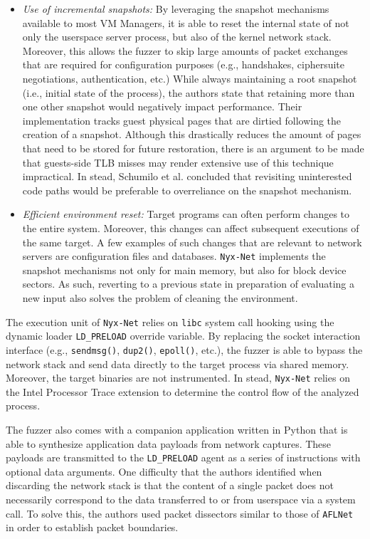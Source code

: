 \begin{itemize}
    \item \textit{Use of incremental snapshots:} By leveraging the snapshot mechanisms available to most VM Managers, it is able to reset the internal state of not only the userspace server process, but also of the kernel network stack. Moreover, this allows the fuzzer to skip large amounts of packet exchanges that are required for configuration purposes (e.g., handshakes, ciphersuite negotiations, authentication, etc.) While always maintaining a root snapshot (i.e., initial state of the process), the authors state that retaining more than one other snapshot would negatively impact performance. Their implementation tracks guest physical pages that are dirtied following the creation of a snapshot. Although this drastically reduces the amount of pages that need to be stored for future restoration, there is an argument to be made that guests-side TLB misses may render extensive use of this technique impractical. In stead, Schumilo et al. concluded that revisiting uninterested code paths would be preferable to overreliance on the snapshot mechanism.

    \item \textit{Efficient environment reset:} Target programs can often perform changes to the entire system. Moreover, this changes can affect subsequent executions of the same target. A few examples of such changes that are relevant to network servers are configuration files and databases. \texttt{Nyx-Net} implements the snapshot mechanisms not only for main memory, but also for block device sectors. As such, reverting to a previous state in preparation of evaluating a new input also solves the problem of cleaning the environment.
\end{itemize}

The execution unit of \texttt{Nyx-Net} relies on \texttt{libc} system call hooking using the dynamic loader \texttt{LD\_PRELOAD} override variable. By replacing the socket interaction interface (e.g., \texttt{sendmsg()}, \texttt{dup2()}, \texttt{epoll()}, etc.), the fuzzer is able to bypass the network stack and send data directly to the target process via shared memory. Moreover, the target binaries are not instrumented. In stead, \texttt{Nyx-Net} relies on the Intel Processor Trace extension to determine the control flow of the analyzed process.

The fuzzer also comes with a companion application written in Python that is able to synthesize application data payloads from network captures. These payloads are transmitted to the \texttt{LD\_PRELOAD} agent as a series of instructions with optional data arguments. One difficulty that the authors identified when discarding the network stack is that the content of a single packet does not necessarily correspond to the data transferred to or from userspace via a system call. To solve this, the authors used packet dissectors similar to those of \texttt{AFLNet} in order to establish packet boundaries.


